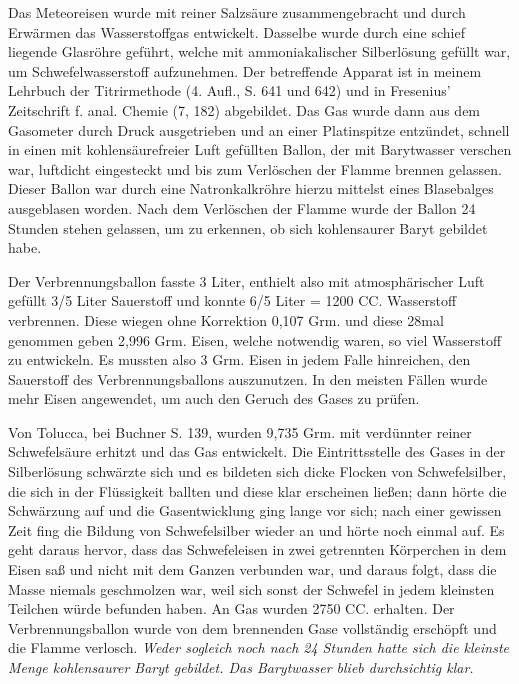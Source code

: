 \documentclass[a4paper, 11pt, oneside, german]{article}
\begin{document}
Das Meteoreisen wurde mit reiner Salzsäure zusammengebracht und durch Erwärmen das Wasserstoffgas entwickelt. Dasselbe wurde durch eine schief liegende Glasröhre geführt, welche mit ammoniakalischer Silberlösung gefüllt war, um Schwefelwasserstoff aufzunehmen. Der betreffende Apparat ist in meinem Lehrbuch der Titrirmethode (4. Aufl., S. 641 und 642) und in Fresenius' Zeitschrift f. anal. Chemie (7, 182) abgebildet. Das Gas wurde dann aus dem Gasometer durch Druck ausgetrieben und an einer Platinspitze entzündet, schnell in einen mit kohlensäurefreier Luft gefüllten Ballon, der mit Barytwasser verschen war, luftdicht eingesteckt und bis zum Verlöschen der Flamme brennen gelassen. Dieser Ballon war durch eine Natronkalkröhre hierzu mittelst eines Blasebalges ausgeblasen worden. Nach dem Verlöschen der Flamme wurde der Ballon 24 Stunden stehen gelassen, um zu erkennen, ob sich kohlensaurer Baryt gebildet habe.

Der Verbrennungsballon fasste 3 Liter, enthielt also mit atmosphärischer Luft gefüllt 3/5 Liter Sauerstoff und konnte 6/5 Liter = 1200 CC. Wasserstoff verbrennen. Diese wiegen ohne Korrektion 0,107 Grm. und diese 28mal genommen geben 2,996 Grm. Eisen, welche notwendig waren, so viel Wasserstoff zu entwickeln. Es mussten also 3 Grm. Eisen in jedem Falle hinreichen, den Sauerstoff des Verbrennungsballons auszunutzen. In den meisten Fällen wurde mehr Eisen angewendet, um auch den Geruch des Gases zu prüfen.

Von Tolucca, bei Buchner S. 139, wurden 9,735 Grm. mit verdünnter reiner Schwefelsäure erhitzt und das Gas entwickelt. Die Eintrittsstelle des Gases in der Silberlösung schwärzte sich und es bildeten sich dicke Flocken von Schwefelsilber, die sich in der Flüssigkeit ballten und diese klar erscheinen ließen; dann hörte die Schwärzung auf und die Gasentwicklung ging lange vor sich; nach einer gewissen Zeit fing die Bildung von Schwefelsilber wieder an und hörte noch einmal auf. Es geht daraus hervor, dass das Schwefeleisen in zwei getrennten Körperchen in dem Eisen saß und nicht mit dem Ganzen verbunden war, und daraus folgt, dass die Masse niemals geschmolzen war, weil sich sonst der Schwefel in jedem kleinsten Teilchen würde befunden haben. An Gas wurden 2750 CC. erhalten. Der Verbrennungsballon wurde von dem brennenden Gase vollständig erschöpft und die Flamme verlosch. \emph{Weder sogleich noch nach 24 Stunden hatte sich die kleinste Menge kohlensaurer Baryt gebildet. Das Barytwasser blieb durchsichtig klar.}
\end{document}
